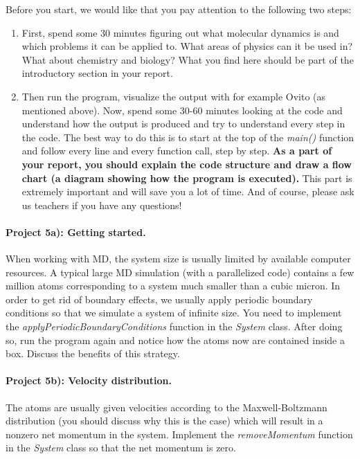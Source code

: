 \documentclass[%
oneside,                 %
final,                   %
10pt]{article}
\begin{document}
Before you start, we would like that you pay attention to the following two steps:
\begin{enumerate}
 \item First, spend some 30 minutes figuring out what molecular dynamics is and which problems it can be applied to. What areas of physics can it be used in? What about chemistry and biology? What you find here should be part of the  introductory section in your report.

 \item Then run the program, visualize the output with for example Ovito (as mentioned above). Now, spend some 30-60 minutes looking at the code and understand how the output is produced and try to understand every step in the code. The best way to do this is to start at the top of the \emph{main()} function and follow every line and every function call, step by step. \textbf{As a part of your report, you should explain the code structure and draw a flow chart (a diagram showing how the program is executed).} This part is extremely important and will save you a lot of time. And of course, please ask us teachers if you have any questions!
\end{enumerate}

\noindent
\paragraph{Project 5a): Getting started.}
When working with MD, the system size is usually limited by available computer resources. A typical large MD simulation (with a parallelized code) contains a few million atoms corresponding to a system much smaller than a cubic micron. In order to get rid of boundary effects, we usually apply periodic boundary conditions so that we simulate a system of infinite size. You need to implement the \emph{applyPeriodicBoundaryConditions} function in the \emph{System} class. After doing so, run the program again and notice how the atoms now are contained inside a box. Discuss the benefits of this strategy.

\paragraph{Project 5b): Velocity distribution.}
The atoms are usually given velocities according to the Maxwell-Boltzmann distribution (you should discuss why this is the case) which will result in a nonzero net momentum in the system. Implement the \emph{removeMomentum} function in the \emph{System} class so that the net momentum is zero.
\end{document}
